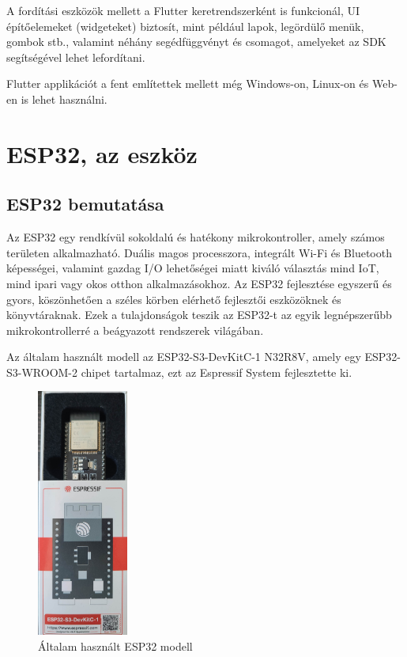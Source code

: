 \documentclass{thesis-ekf}
\theoremstyle{definition}
\theoremstyle{remark}
\begin{document}
	
	A fordítási eszközök mellett a Flutter keretrendszerként is funkcionál, UI építőelemeket (widgeteket) biztosít, mint például lapok, legördülő menük, gombok stb., valamint néhány segédfüggvényt és csomagot, amelyeket az SDK segítségével lehet lefordítani.\cite{bib_flutter_short}
	
	Flutter applikációt a fent említettek mellett még Windows-on, Linux-on és Web-en is lehet használni.
	\chapter{ESP32, az eszköz}
	\label{ch_esp}
	\section{ESP32 bemutatása}
	\label{se_espB}
	Az ESP32 egy rendkívül sokoldalú és hatékony mikrokontroller, amely számos területen alkalmazható. Duális magos processzora, integrált Wi-Fi és Bluetooth képességei, valamint gazdag I/O lehetőségei miatt kiváló választás mind IoT, mind ipari vagy okos otthon alkalmazásokhoz. Az ESP32 fejlesztése egyszerű és gyors, köszönhetően a széles körben elérhető fejlesztői eszközöknek és könyvtáraknak. Ezek a tulajdonságok teszik az ESP32-t az egyik legnépszerűbb mikrokontrollerré a beágyazott rendszerek világában.
	
	Az általam  használt modell az ESP32-S3-DevKitC-1 N32R8V, amely egy ESP32-S3-WROOM-2 chipet tartalmaz, ezt az Espressif System fejlesztette ki.
	\begin{figure}[!ht]
		\centering
		\includegraphics[width=3cm]{MyESP32}
		\caption{Általam használt ESP32 modell}
		\label{img_myesp}
	\end{figure}
	
\end{document}
